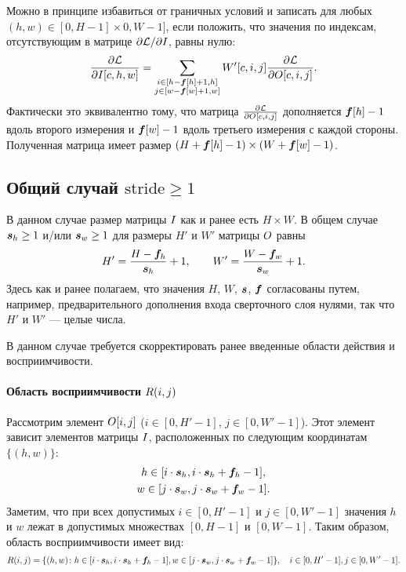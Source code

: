 \documentclass{book}
\numberwithin{theorem}{chapter}
\numberwithin{statement}{chapter}
\numberwithin{lemma}{chapter}
\theoremstyle{definition}
\numberwithin{task}{chapter}
\theoremstyle{remark}
\numberwithin{example}{chapter}
\theoremstyle{definition}
\numberwithin{definition}{chapter}
\theoremstyle{remark}
\theoremstyle{remark}
\numberwithin{lyrics}{section}
\begin{document}
Можно в принципе избавиться от граничных условий и записать для любых $(h, w) \in [0, H - 1] \times 0, W - 1]$, если положить, что значения по индексам, отсутствующим в матрице $\partial \mathcal{L} / \partial I$, равны нулю:
\begin{equation}
\frac{\partial \mathcal{L} }{\partial I[c, h, w]} = \sum\limits_{\substack{i \in [h - \boldsymbol{f}[h] + 1, h] \\ j \in [w - \boldsymbol{f}[w] + 1, w]}} W'[c, i, j] \frac{\partial \mathcal{L} }{\partial O[c, i, j]}.
\end{equation}
Фактически это эквивалентно тому, что матрица $\frac{\partial \mathcal{L} }{\partial O[c, i, j]}$ дополняется $\boldsymbol{f}[h] - 1$ вдоль второго измерения и $\boldsymbol{f}[w] - 1$ вдоль третьего измерения с каждой стороны. Полученная матрица имеет размер $(H + \boldsymbol{f}[h] - 1) \times (W + \boldsymbol{f}[w] - 1)$. 

\subsection{Общий случай $\text{stride} \ge 1$}
В данном случае размер матрицы $I$ как и ранее есть $H \times W$. В общем случае $\boldsymbol{s}_h \ge 1$ и/или $\boldsymbol{s}_w \ge 1$ для размеры $H' $ и $W'$ матрицы $O$ равны
\begin{equation}
H' = \frac{H - \boldsymbol{f}_h}{\boldsymbol{s}_h} + 1, \qquad W' = \frac{W - \boldsymbol{f}_w}{\boldsymbol{s}_w} + 1.
\end{equation}
Здесь как и ранее полагаем, что значения $H$, $W$, $\boldsymbol{s}$, $\boldsymbol{f}$ согласованы путем, например, предварительного дополнения входа сверточного слоя нулями, так что $H'$  и $W'$ --- целые числа.

В данном случае требуется скорректировать ранее введенные области действия и восприимчивости.

\paragraph{Область восприимчивости $R(i, j)$}
Рассмотрим элемент $O[i, j]$ ($i \in [0, H'- 1]$, $j \in [0, W' - 1]$). Этот элемент зависит элементов матрицы $I$, расположенных по следующим координатам $\{(h, w)\}$:
\begin{gather*}
h \in [i \cdot \boldsymbol{s}_h, i \cdot \boldsymbol{s}_h + \boldsymbol{f}_h - 1], \\
w \in [j \cdot \boldsymbol{s}_w, j \cdot \boldsymbol{s}_w + \boldsymbol{f}_w - 1].
\end{gather*}
Заметим, что при всех допустимых $i \in [0, H'- 1]$ и $j \in [0, W' - 1]$ значения $h$ и $w$ лежат в допустимых множествах $[0, H - 1]$ и $[0, W - 1]$. Таким образом, область восприимчивости имеет вид:
\begin{equation}
R(i, j) = \{(h, w)\colon h \in [i \cdot \boldsymbol{s}_h, i \cdot \boldsymbol{s}_h + \boldsymbol{f}_h - 1], w \in [j \cdot \boldsymbol{s}_w, j \cdot \boldsymbol{s}_w + \boldsymbol{f}_w - 1]\}, \quad i \in [0, H'- 1], j \in [0, W' - 1].
\end{equation}
\end{document}
